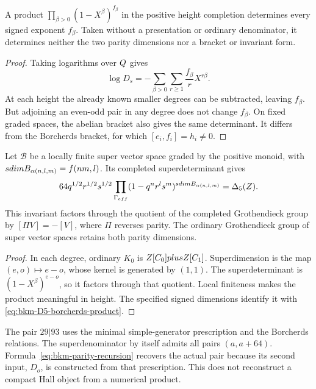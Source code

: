 \begin{proposition}
\label{prop:bkm-information-content}
A product $\prod_{\beta>0}(1-X^\beta)^{f_\beta}$ in the positive
height completion determines every signed exponent $f_\beta$.
Taken without a presentation or ordinary denominator, it determines
neither the two parity dimensions nor a bracket or invariant form.
\end{proposition}
\begin{proof}
Taking logarithms over $Q$ gives
\[
 \log D_s=-\sum_{\beta>0}\sum_{r\geq1}
                 \frac{f_\beta}{r}X^{r\beta}.
\]
At each height the already known smaller degrees can be subtracted,
leaving $f_\beta$. But adjoining an even-odd pair in any degree
does not change $f_\beta$. On fixed graded spaces, the abelian
bracket also gives the same determinant. It differs from the
Borcherds bracket, for which $[e_i,f_i]=h_i\ne0$.
\end{proof}

\begin{proposition}
\label{prop:bkm-determinant-grothendieck}
Let $\mathcal B$ be a locally finite super vector space graded by
the positive monoid, with $sdimB_{\alpha(n,l,m)}=f(nm,l)$.
Its completed superdeterminant gives
\[
 64q^{1/2}r^{1/2}s^{1/2}
 \prod_{\Gamma_{eff}}(1-q^nr^ls^m)^{sdimB_{\alpha(n,l,m)}}
 =\Delta_5(Z).
\]
This invariant factors through the quotient of the completed
Grothendieck group by $[\Pi V]=-[V]$, where $\Pi$ reverses parity.
The ordinary Grothendieck group of super vector spaces retains both
parity dimensions.
\end{proposition}
\begin{proof}
In each degree, ordinary $K_0$ is $Z[C_{0}]
plusZ[C_{1}]$. Superdimension is the map
$(e,o)\mapsto e-o$, whose kernel is generated by $(1,1)$.
The superdeterminant is $(1-X^\beta)^{e-o}$, so it factors through
that quotient. Local finiteness makes the product meaningful in
height. The specified signed dimensions identify it with
\eqref{eq:bkm-D5-borcherds-product}.
\end{proof}

\begin{remark}
\label{rem:bkm-determinant-forgets}
The pair $29|93$ uses the minimal simple-generator prescription
and the Borcherds relations. The superdenominator by itself admits
all pairs $(a,a+64)$. Formula~\eqref{eq:bkm-parity-recursion} recovers
the actual pair because its second input, $D_o$, is constructed
from that prescription. This does not reconstruct a compact Hall
object from a numerical product.
\end{remark}

